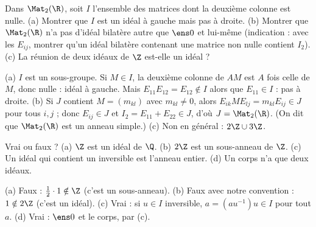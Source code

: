 \begin{exo}\label{exo-ideal-gauche}
Dans $\Mat_2(\R)$, soit $I$ l'ensemble des matrices dont la deuxième colonne est nulle. (a) Montrer que $I$ est un idéal à gauche mais pas à droite. (b) Montrer que $\Mat_2(\R)$ n'a pas d'idéal bilatère autre que $\ens0$ et lui-même (indication : avec les $E_{ij}$, montrer qu'un idéal bilatère contenant une matrice non nulle contient $I_2$). (c) La réunion de deux idéaux de $\Z$ est-elle un idéal ?
\begin{corrige}
(a) $I$ est un sous-groupe. Si $M\in I$, la deuxième colonne de $AM$ est $A$ fois celle de $M$, donc nulle : idéal à gauche. Mais $E_{11}E_{12}=E_{12}\notin I$ alors que $E_{11}\in I$ : pas à droite.
(b) Si $J$ contient $M=(m_{kl})$ avec $m_{kl}\neq0$, alors $E_{ik}ME_{lj}=m_{kl}E_{ij}\in J$ pour tous $i,j$ ; donc $E_{ij}\in J$ et $I_2=E_{11}+E_{22}\in J$, d'où $J=\Mat_2(\R)$. (On dit que $\Mat_2(\R)$ est un anneau simple.)
(c) Non en général : $2\Z\cup3\Z$.
\end{corrige}
\end{exo}
\begin{exo}
Vrai ou faux ? (a) $\Z$ est un idéal de $\Q$. (b) $2\Z$ est un sous-anneau de $\Z$. (c) Un idéal qui contient un inversible est l'anneau entier. (d) Un corps n'a que deux idéaux.
\begin{corrige}
(a) Faux : $\frac12\cdot1\notin\Z$ (c'est un sous-anneau). (b) Faux avec notre convention : $1\notin2\Z$ (c'est un idéal). (c) Vrai : si $u\in I$ inversible, $a=(au^{-1})u\in I$ pour tout $a$. (d) Vrai : $\ens0$ et le corps, par (c).
\end{corrige}
\end{exo}

